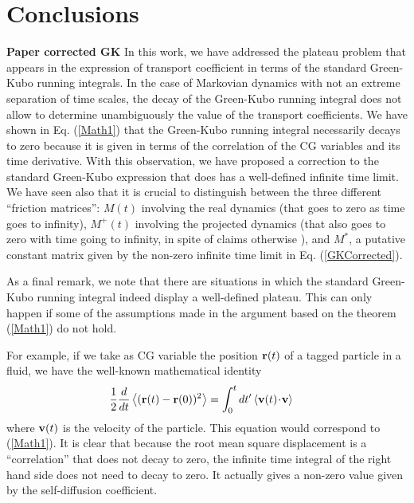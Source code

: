 \documentclass[a4paper,openright,12pt]{book}
\newcommand{\esc}{\!\cdot\!}
\newcommand{\Note}[1]{{\bf \color{red}#1}}    %
\newcommand{\llangle}{\left\langle}
\newcommand{\rrangle}{\right\rangle}
\begin{document}
\section{Conclusions}
\label{Sec:Conclusions}
\Note{Paper corrected GK}
In this  work, we have addressed  the plateau problem that  appears in
the  expression of  transport  coefficient in  terms  of the  standard
Green-Kubo running integrals.  In the  case of Markovian dynamics with
not an extreme separation of time  scales, the decay of the Green-Kubo
running integral does  not allow to determine  unambiguously the value
of the  transport coefficients.  We  have shown in  Eq.  (\ref{Math1})
that  the  Green-Kubo  running  integral necessarily  decays  to  zero
because it  is given in terms  of the correlation of  the CG variables
and its  time derivative.  With  this observation, we have  proposed a
correction  to  the  standard  Green-Kubo  expression  that  does  has  a
well-defined infinite time limit. We have seen also that it is crucial
to  distinguish between  the  three  different ``friction  matrices'':
$M(t)$ involving the real dynamics (that  goes to zero as time goes to
infinity), $M^+(t)$  involving the projected dynamics  (that also goes
to zero  with time  going to  infinity, in  spite of  claims otherwise
\cite{Kubo1991,Espanol_Zuniga1993}),  and $M^*$,  a putative  constant
matrix   given    by   the    non-zero   infinite   time    limit   in
Eq. (\ref{GKCorrected}).

As a  final remark,  we note  that there are  situations in  which the
standard  Green-Kubo running  integral indeed  display a  well-defined
plateau.  This can only happen if  some of the assumptions made in the
argument based on the theorem (\ref{Math1}) do not hold.

For example, if we take as CG  variable the position ${\bf r}(t)$ of a
tagged  particle  in a  fluid,  we  have the  well-known  mathematical
identity
\begin{align}
\frac{1}{2}\frac{d}{dt}\llangle({\bf r}(t)-{\bf r}(0))^2\rrangle&=  \int_0^tdt'\llangle {\bf v}(t)\esc {\bf v}\rrangle 
\end{align}
where ${\bf  v}(t)$ is  the velocity of  the particle.   This equation
would correspond to  (\ref{Math1}). It is clear that  because the root
mean square displacement  is a ``correlation'' that does  not decay to
zero, the infinite time integral of  the right hand side does not need
to decay  to zero.  It actually  gives a non-zero  value given  by the
self-diffusion coefficient.
\end{document}
